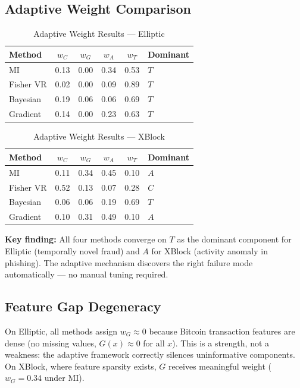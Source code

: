 \documentclass[journal]{IEEEtran}
\begin{document}
\subsection{Adaptive Weight Comparison}
\label{ssec:weight_comparison}

\begin{table}[!t]
\centering
\caption{Adaptive Weight Results --- Elliptic}
\label{tab:weights_elliptic}
\begin{tabular}{@{}lccccl@{}}
\toprule
\textbf{Method} & $w_C$ & $w_G$ & $w_A$ & $w_T$ & \textbf{Dominant} \\
\midrule
MI        & 0.13 & 0.00 & 0.34 & 0.53 & $T$ \\
Fisher VR & 0.02 & 0.00 & 0.09 & 0.89 & $T$ \\
Bayesian  & 0.19 & 0.06 & 0.06 & 0.69 & $T$ \\
Gradient  & 0.14 & 0.00 & 0.23 & 0.63 & $T$ \\
\bottomrule
\end{tabular}
\end{table}

\begin{table}[!t]
\centering
\caption{Adaptive Weight Results --- XBlock}
\label{tab:weights_xblock}
\begin{tabular}{@{}lccccl@{}}
\toprule
\textbf{Method} & $w_C$ & $w_G$ & $w_A$ & $w_T$ & \textbf{Dominant} \\
\midrule
MI        & 0.11 & 0.34 & 0.45 & 0.10 & $A$ \\
Fisher VR & 0.52 & 0.13 & 0.07 & 0.28 & $C$ \\
Bayesian  & 0.06 & 0.06 & 0.19 & 0.69 & $T$ \\
Gradient  & 0.10 & 0.31 & 0.49 & 0.10 & $A$ \\
\bottomrule
\end{tabular}
\end{table}

\textbf{Key finding:} All four methods converge on $T$ as the dominant component for Elliptic (temporally novel fraud) and $A$ for XBlock (activity anomaly in phishing). The adaptive mechanism discovers the right failure mode automatically --- no manual tuning required.

\subsection{Feature Gap Degeneracy}
\label{ssec:feature_gap}

On Elliptic, all methods assign $w_G \approx 0$ because Bitcoin transaction features are dense (no missing values, $G(x) \approx 0$ for all $x$). This is a strength, not a weakness: the adaptive framework correctly silences uninformative components. On XBlock, where feature sparsity exists, $G$ receives meaningful weight ($w_G = 0.34$ under MI).
\end{document}
